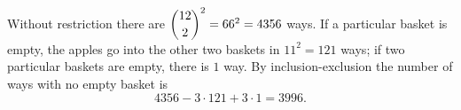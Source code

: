 Without restriction there are $\dbinom{12}{2}^2=66^2=4356$ ways. If a particular basket is empty, the apples go into the other two baskets in $11^2=121$ ways; if two particular baskets are empty, there is $1$ way. By inclusion-exclusion the number of ways with no empty basket is
\[
4356-3\cdot121+3\cdot1=\boxed{3996}.
\]
